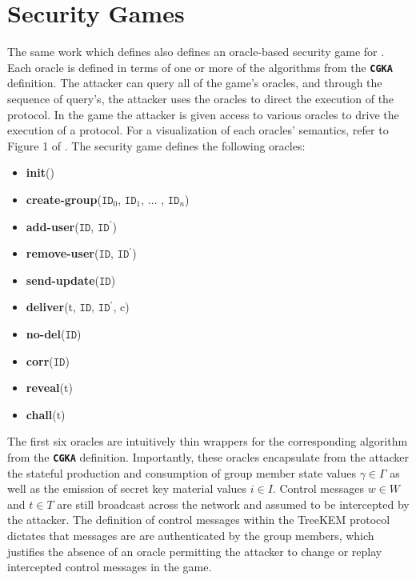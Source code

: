 \hypertarget{sec:security-games}{%
\section{Security Games}\label{sec:security-games}}

The same work which defines  also defines an oracle-based security game for .
Each oracle is defined in terms of one or more of the algorithms from the \textbf{\texttt{CGKA}} definition.
The attacker can query all of the game's oracles, and through the sequence of query's, the attacker uses the oracles to direct the execution of the  protocol.
In the game the attacker is given access to various oracles to drive the execution of a  protocol.
For a visualization of each oracles' semantics, refer to Figure 1 of \autocite{alwen2020security}.
The  security game defines the following oracles:

\begin{itemize}
\item
  \textbf{init}()
\item
  \textbf{create-group}(\(\texttt{ID}_0\), \(\texttt{ID}_1\), \(\dots\) , \(\texttt{ID}_n\))
\item
  \textbf{add-user}(\(\texttt{ID}\), \(\texttt{ID}^{'}\))
\item
  \textbf{remove-user}(\(\texttt{ID}\), \(\texttt{ID}^{'}\))
\item
  \textbf{send-update}(\(\texttt{ID}\))
\item
  \textbf{deliver}(t, \(\texttt{ID}\), \(\texttt{ID}^{'}\), c)
\item
  \textbf{no-del}(\(\texttt{ID}\))
\item
  \textbf{corr}(\(\texttt{ID}\))
\item
  \textbf{reveal}(t)
\item
  \textbf{chall}(t)
\end{itemize}

The first six oracles are intuitively thin wrappers for the corresponding algorithm from the \textbf{\texttt{CGKA}} definition.
Importantly, these oracles encapsulate from the attacker the stateful production and consumption of group member state values \(\gamma \in \Gamma\) as well as the emission of secret key material values \(i \in I\).
Control messages \(w \in W\) and \(t \in T\) are still broadcast across the network and assumed to be intercepted by the attacker.
The definition of control messages within the TreeKEM protocol dictates that messages are are authenticated by the group members, which justifies the absence of an oracle permitting the attacker to change or replay intercepted control messages in the  game.

